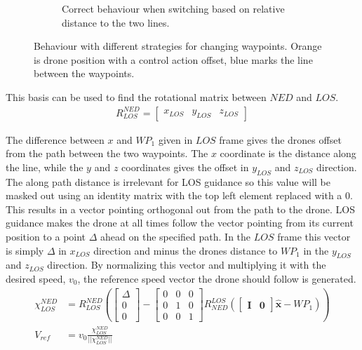 \begin{figure}[t]
\begin{subfigure}[b]{.48\textwidth}
    \caption{Correct behaviour when switching based on relative distance to the two lines.}
    \label{fig:Relative_distance_switch}
\end{subfigure}
\caption{Behaviour with different strategies for changing waypoints. Orange is drone position with a control action offset, blue marks the line between the waypoints.}
\end{figure}

This basis can be used to find the rotational matrix between $NED$ and $LOS$.
\begin{align}
    R^{NED}_{LOS} = \begin{bmatrix} x_{LOS} & y_{LOS} & z_{LOS}\end{bmatrix}
\end{align}

The difference between $x$ and $WP_1$ given in $LOS$ frame gives the drones offset from the path between the two waypoints. The $x$ coordinate is the distance along the line, while the $y$ and $z$ coordinates gives the offset in $y_{LOS}$ and $z_{LOS}$ direction. The along path distance is irrelevant for LOS guidance so this value will be masked out using an identity matrix with the top left element replaced with a 0. This results in a vector pointing orthogonal out from the path to the drone. LOS guidance makes the drone at all times follow the vector pointing from its current position to a point $\Delta$ ahead on the specified path. In the $LOS$ frame this vector is simply $\Delta$ in $x_{LOS}$ direction and minus the drones distance to $WP_1$ in the $y_{LOS}$ and $z_{LOS}$ direction. By normalizing this vector and multiplying it with the desired speed, $v_0$, the reference speed vector the drone should follow is generated.
\begin{align}
   \chi^{NED}_{LOS} & = R^{NED}_{LOS} \left(  \begin{bmatrix}\Delta \\ 0 \\ 0\end{bmatrix} - \begin{bmatrix} 0 & 0 & 0 \\ 0 & 1 & 0 \\ 0 & 0 & 1 \end{bmatrix} R^{LOS}_{NED} (\begin{bmatrix} \mathbf{I} & \mathbf{0} \end{bmatrix} \hat{\textbf{x}} - WP_1) \right) \label{chi^NED_los} \\
   V_{ref} & = v_0 \frac{\chi^{NED}_{LOS} }{|| \chi^{NED}_{LOS} ||}
\end{align}

